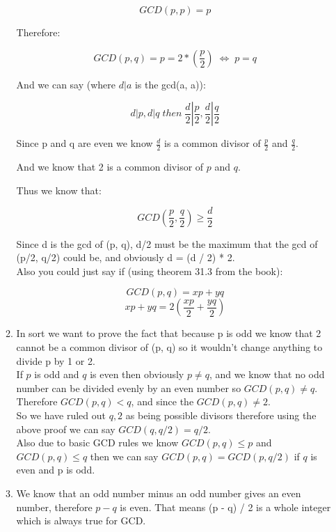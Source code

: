 \documentclass{article}
\DeclareRobustCommand\iff{\;\Longleftrightarrow\;}
\begin{document}
\begin{enumerate}
\begin{enumerate}
        \[GCD(p, p) = p\]
        
        Therefore:

        \[GCD(p, q) = p = 2 * (\frac{p}{2}) \iff p = q\]

        And we can say (where $d|a$ is the gcd(a, a)):

        \[d|p, d|q\;then\;\frac{d}{2}|\frac{p}{2}, \frac{d}{2}|\frac{q}{2}\]

        Since p and q are even we know $\frac{d}{2}$ is a common divisor of $\frac{p}{2}$ and $\frac{q}{2}$.

        And we know that 2 is a common divisor of $p$ and $q$.

        Thus we know that:

        \[GCD(\frac{p}{2},\frac{q}{2}) \geq \frac{d}{2}\]

        Since d is the gcd of (p, q), d/2 must be the maximum that the gcd of (p/2, q/2) could be, and obviously d = (d / 2) * 2. \\

        Also you could just say if (using theorem 31.3 from the book):

        \[GCD(p, q) = xp + yq\]
        \[xp + yq = 2(\frac{xp}{2} + \frac{yq}{2})\]

        \item In sort we want to prove the fact that because p is odd we know that 2 cannot be a common divisor of (p, q) so it wouldn't change anything to divide p by 1 or 2.\\
        
        If $p$ is odd and $q$ is even then obviously $p \neq q$,
        and we know that no odd number can be divided evenly by an even number so $GCD(p, q) \neq q$.\\

        Therefore $GCD(p, q) < q$, and since the $GCD(p, q) \neq 2$.\\

        So we have ruled out $q, 2$ as being possible divisors therefore using the above proof we can say $GCD(q, q/2) = q/2$.\\

        Also due to basic GCD rules we know $GCD(p, q) \leq p$ and $GCD(p, q) \leq q$ then we can say $GCD(p, q) = GCD(p, q/2)$ if $q$ is even and p is odd. 

        \item We know that an odd number minus an odd number gives an even number, therefore $p - q$ is even. That means (p - q) / 2 is a whole integer which is always true for GCD.\\
        

\end{enumerate}
\end{enumerate}
\end{document}
